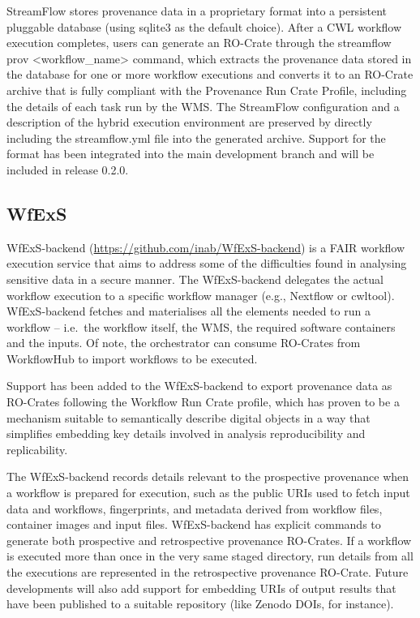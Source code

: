 \documentclass[10pt,letterpaper]{article}
\begin{document}
StreamFlow stores provenance data in a proprietary format into a persistent pluggable database (using sqlite3 as the default choice).
After a CWL workflow execution completes, users can generate an RO-Crate through the streamflow prov \textless workflow\_name\textgreater{}
command, which extracts the provenance data stored in the database for one or more workflow executions and converts it to an RO-Crate archive that is fully compliant with the Provenance Run Crate Profile, including the details of each task run by the WMS.
The StreamFlow configuration and a description of the hybrid execution environment are preserved by directly including the streamflow.yml file into the generated archive.
Support for the format has been integrated into the main development branch and will be included in release 0.2.0.

\subsection{WfExS}\label{wfexs}

WfExS-backend (\url{https://github.com/inab/WfExS-backend}) is a FAIR workflow execution service that aims to address some of the difficulties found in analysing sensitive data in a secure manner.
The WfExS-backend delegates the actual workflow execution to a specific workflow manager (e.g., Nextflow or cwltool).
WfExS-backend fetches and materialises all the elements needed to run a workflow -- i.e.~the workflow itself, the WMS, the required software containers and the inputs.
Of note, the orchestrator can consume RO-Crates from WorkflowHub to import workflows to be executed.

Support has been added to the WfExS-backend to export provenance data as RO-Crates following the Workflow Run Crate profile, which has proven to be a mechanism suitable to semantically describe digital objects in a way that simplifies embedding key details involved in analysis reproducibility and replicability.

The WfExS-backend records details relevant to the prospective provenance when a workflow is prepared for execution, such as the public URIs used to fetch input data and workflows, fingerprints, and metadata derived from workflow files, container images and input files.
WfExS-backend has explicit commands to generate both prospective and retrospective provenance RO-Crates.
If a workflow is executed more than once in the very same staged directory, run details from all the executions are represented in the retrospective provenance RO-Crate.
Future developments will also add support for embedding URIs of output results that have been published to a suitable repository (like Zenodo DOIs, for instance).
\end{document}
